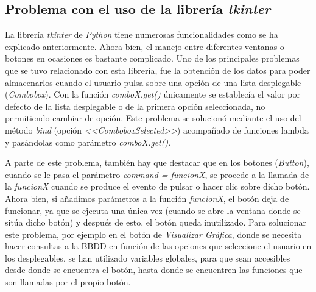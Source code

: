 \subsection{Problema con el uso de la librería \emph{tkinter}}

La librería \emph{tkinter} de \emph{Python} tiene numerosas funcionalidades como se ha explicado anteriormente. Ahora bien, el manejo entre diferentes ventanas o botones en ocasiones es bastante complicado.
Uno de los principales problemas que se tuvo relacionado con esta librería, fue la obtención de los datos para poder almacenarlos cuando el usuario pulsa sobre una opción de una lista desplegable (\emph{Combobox}). Con la función \emph{comboX.get()} únicamente se establecía el valor por defecto de la lista desplegable o de la primera opción seleccionada, no permitiendo cambiar de opción.
Este problema se solucionó mediante el uso del método \emph{bind} (opción \emph{<<ComboboxSelected>>}) acompañado de funciones lambda y pasándolas como parámetro \emph{comboX.get()}.

A parte de este problema, también hay que destacar que en los botones (\emph{Button}), cuando se le pasa el parámetro \emph{command = funcionX}, se procede a la llamada de la \emph{funcionX} cuando se produce el evento de pulsar o hacer clic sobre dicho botón. Ahora bien, si añadimos parámetros a la función \emph{funcionX}, el botón deja de funcionar, ya que se ejecuta una única vez (cuando se abre la ventana donde se sitúa dicho botón) y después de esto, el botón queda inutilizado.
Para solucionar este problema, por ejemplo en el botón de \emph{Visualizar Gráfica}, donde se necesita hacer consultas a la BBDD en función de las opciones que seleccione el usuario en los desplegables, se han utilizado variables globales, para que sean accesibles desde donde se encuentra el botón, hasta donde se encuentren las funciones que son llamadas por el propio botón.




